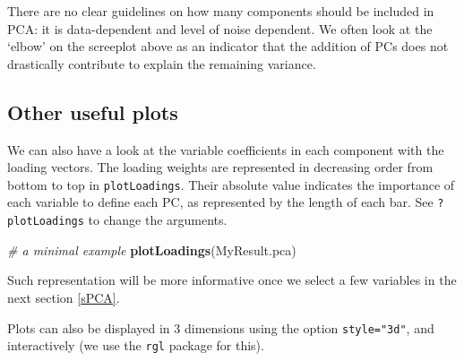 \documentclass[]{book}
\newenvironment{Shaded}{\begin{snugshade}}{\end{snugshade}}
\newcommand{\CommentTok}[1]{\textcolor[rgb]{0.56,0.35,0.01}{\textit{#1}}}
\newcommand{\DataTypeTok}[1]{\textcolor[rgb]{0.13,0.29,0.53}{#1}}
\newcommand{\DecValTok}[1]{\textcolor[rgb]{0.00,0.00,0.81}{#1}}
\newcommand{\FloatTok}[1]{\textcolor[rgb]{0.00,0.00,0.81}{#1}}
\newcommand{\KeywordTok}[1]{\textcolor[rgb]{0.13,0.29,0.53}{\textbf{#1}}}
\newcommand{\NormalTok}[1]{#1}
\newcommand{\OperatorTok}[1]{\textcolor[rgb]{0.81,0.36,0.00}{\textbf{#1}}}
\newcommand{\OtherTok}[1]{\textcolor[rgb]{0.56,0.35,0.01}{#1}}
\newcommand{\StringTok}[1]{\textcolor[rgb]{0.31,0.60,0.02}{#1}}
\begin{document}
There are no clear guidelines on how many components should be included in PCA: it is data-dependent and level of noise dependent. We often look at the `elbow' on the screeplot above as an indicator that the addition of PCs does not drastically contribute to explain the remaining variance.

\hypertarget{other-useful-plots}{%
\subsection{Other useful plots}\label{other-useful-plots}}

We can also have a look at the variable coefficients in each component with the loading vectors. The loading weights are represented in decreasing order from bottom to top in \texttt{plotLoadings}. Their absolute value indicates the importance of each variable to define each PC, as represented by the length of each bar. See \texttt{?plotLoadings} to change the arguments.

\begin{Shaded}
\begin{Highlighting}[]
\CommentTok{# a minimal example}
\KeywordTok{plotLoadings}\NormalTok{(MyResult.pca)}
\end{Highlighting}
\end{Shaded}

\begin{Shaded}
\end{Shaded}

Such representation will be more informative once we select a few variables in the next section \ref{sPCA}.

Plots can also be displayed in 3 dimensions using the option \texttt{style="3d"}, and interactively (we use the \texttt{rgl} package for this).

\begin{Shaded}
\end{Shaded}
\end{document}

